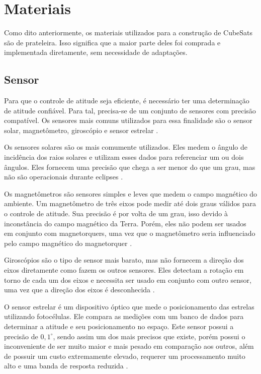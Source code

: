 \documentclass[
	12pt,				%
	openany,			%
	twoside,			%
	a4paper,			%
	english,			%
	french,				%
	spanish,			%
	brazil,				%
	oldfontcommands
	]{abntex2}
\begin{document}
\section[Materiais]{Materiais}

Como dito anteriormente, os materiais utilizados para a construção de CubeSats são de prateleira. Isso significa que a maior parte deles foi comprada e implementada diretamente, sem necessidade de adaptações.

\subsection{Sensor}

Para que o controle de atitude seja eficiente, é necessário ter uma determinação de atitude confiável. Para tal, precisa-se de um conjunto de sensores com precisão compatível. Os sensores mais comuns utilizados para essa finalidade são o sensor solar, magnetômetro, giroscópio e sensor estrelar \cite{FrancLav}.

Os sensores solares são os mais comumente utilizados. Eles medem o ângulo de incidência dos raios solares e utilizam esses dados para referenciar um ou dois ângulos. Eles fornecem uma precisão que chega a ser menor do que um grau, mas não são operacionais durante eclipses \cite{FrancLav}.

Os magnetômetros são sensores simples e leves que medem o campo magnético do ambiente. Um magnetômetro de três eixos pode medir até dois graus válidos para o controle de atitude. Sua precisão é por volta de um grau, isso devido à inconstância do campo magnético da Terra. Porém, eles não podem ser usados em conjunto com magnetorquers, uma vez que o magnetômetro seria influenciado pelo campo magnético do magnetorquer \cite{FrancLav}.

Giroscópios são o tipo de sensor mais barato, mas não fornecem a direção dos eixos diretamente como fazem os outros sensores. Eles detectam a rotação em torno de cada um dos eixos e necessita ser usado em conjunto com outro sensor, uma vez que a direção dos eixos é desconhecida \cite{FrancLav}.

O sensor estrelar é um dispositivo óptico que mede o posicionamento das estrelas utilizando fotocélulas. Ele compara as medições com um banco de dados para determinar a atitude e seu posicionamento no espaço. Este sensor possui a precisão de $0,1^{\circ}$, sendo assim um dos mais precisos que existe, porém possui o inconveniente de ser muito maior e mais pesado em comparação aos outros, além de possuir um custo extremamente elevado, requerer um processamento muito alto e uma banda de resposta reduzida \cite{FrancLav}.
\end{document}
